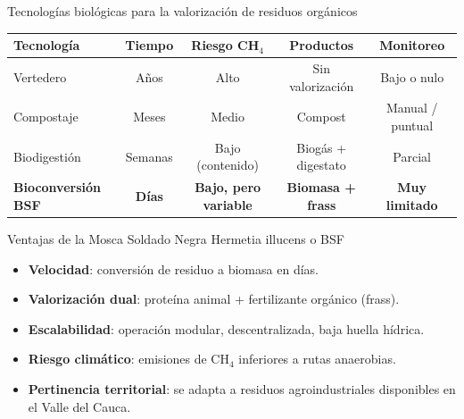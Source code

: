 \documentclass[aspectratio=169, 11pt]{beamer}
\begin{document}
\begin{frame}{Tecnologías biológicas para la valorización de residuos orgánicos}

\footnotesize
\begin{tabular}{lcccc}
\toprule
\textbf{Tecnología} & \textbf{Tiempo} & \textbf{Riesgo CH$_4$} & \textbf{Productos} & \textbf{Monitoreo} \\
\midrule
Vertedero        & Años     & Alto              & Sin valorización       & Bajo o nulo \\
Compostaje       & Meses    & Medio             & Compost                & Manual / puntual \\
Biodigestión     & Semanas  & Bajo (contenido)  & Biogás + digestato     & Parcial \\
\textbf{Bioconversión BSF} & \textbf{Días} & \textbf{Bajo, pero variable} & \textbf{Biomasa + frass} & \textbf{Muy limitado} \\
\bottomrule
\end{tabular}

\vspace{0.25cm}

\begin{block}{Ventajas de la Mosca Soldado Negra Hermetia illucens o BSF}
\footnotesize
\begin{itemize}
    \item \textbf{Velocidad}: conversión de residuo a biomasa en días.
    \item \textbf{Valorización dual}: proteína animal + fertilizante orgánico (frass).
    \item \textbf{Escalabilidad}: operación modular, descentralizada, baja huella hídrica.
    \item \textbf{Riesgo climático}: emisiones de CH$_{4}$ inferiores a rutas anaerobias.
    \item \textbf{Pertinencia territorial}: se adapta a residuos agroindustriales 
          disponibles en el Valle del Cauca.
\end{itemize}
\end{block}


\end{frame}
\end{document}
